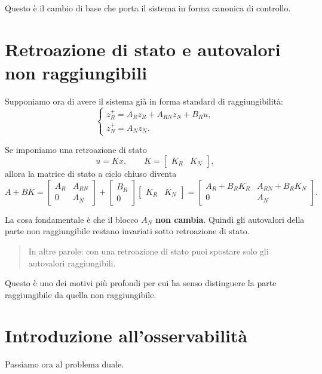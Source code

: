 Questo è il cambio di base che porta il sistema in forma canonica di controllo.

\section{Retroazione di stato e autovalori non raggiungibili}

Supponiamo ora di avere il sistema già in forma standard di raggiungibilità:
\[
\begin{cases}
z_R^+=A_R z_R + A_{RN} z_N + B_R u,\\
z_N^+=A_N z_N.
\end{cases}
\]

Se imponiamo una retroazione di stato
\[
u=Kx,
\qquad
K=\begin{bmatrix}K_R & K_N\end{bmatrix},
\]
allora la matrice di stato a ciclo chiuso diventa
\[
A+BK
=
\begin{bmatrix}
A_R & A_{RN}\\
0 & A_N
\end{bmatrix}
+
\begin{bmatrix}
B_R\\0
\end{bmatrix}
\begin{bmatrix}
K_R & K_N
\end{bmatrix}
=
\begin{bmatrix}
A_R+B_RK_R & A_{RN}+B_RK_N\\
0 & A_N
\end{bmatrix}.
\]

La cosa fondamentale è che il blocco \(A_N\) \textbf{non cambia}.  
Quindi gli autovalori della parte non raggiungibile restano invariati sotto retroazione di stato.

\begin{quote}
In altre parole: con una retroazione di stato puoi spostare solo gli autovalori raggiungibili.
\end{quote}

Questo è uno dei motivi più profondi per cui ha senso distinguere la parte raggiungibile da quella non raggiungibile.

\section{Introduzione all’osservabilità}

Passiamo ora al problema duale.

